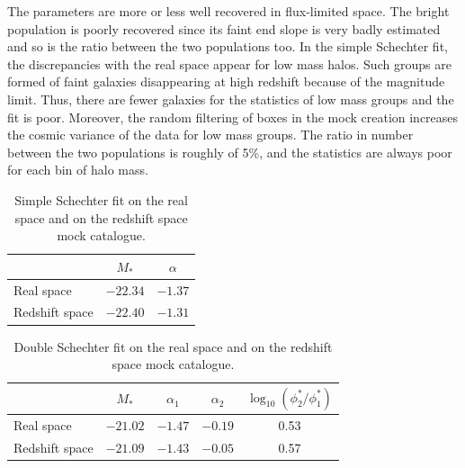 The parameters are more or less well recovered in flux-limited space. The
bright population is poorly recovered since its faint end slope is very badly
estimated and so is the ratio between the two populations too. In the simple
Schechter fit, the discrepancies with the real space appear for low mass halos.
Such groups are formed of faint galaxies disappearing at high redshift because
of the magnitude limit. Thus, there are fewer galaxies for the statistics of
low mass groups and the fit is poor. Moreover, the random filtering of boxes in
the mock creation increases the cosmic variance of the data for low mass
groups. The ratio in number between the two populations is roughly of 5\%, and
the statistics are always poor for each bin of halo mass.
%
\begin{table}
    \centering
    \caption{Simple Schechter fit on the real space and on the redshift space
    mock catalogue.}
    \begin{tabular}{lcc}
        \toprule
        & $M_*$ & $\alpha$ \\
        \toprule
        Real space & $-22.34$ & $-1.37$ \\
        \midrule
        Redshift space & $-22.40$ & $-1.31$ \\
        \bottomrule
    \end{tabular}
\end{table}
%
\begin{table}
    \centering
    \caption{Double Schechter fit on the real space and on the redshift space
    mock catalogue.}
    \begin{tabular}{lcccc}
        \toprule
        & $M_*$ & $\alpha_1$ & $\alpha_2$ &
        $\log_{10}\left(\phi_2^*/\phi_1^*\right)$ \\
        \toprule
        Real space & $-21.02$ & $-1.47$ & $-0.19$ & 0.53 \\
        \midrule
        Redshift space & $-21.09$ & $-1.43$ & $-0.05$ & 0.57 \\
        \bottomrule
    \end{tabular}
\end{table}

